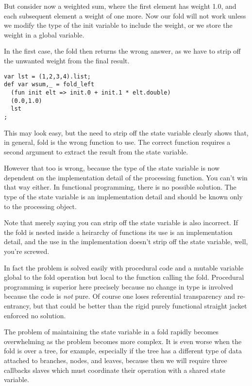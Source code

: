 \documentclass{article}
\begin{document}
But consider now a weighted sum, where the first element
has weight 1.0, and each subsequent element a weight of
one more. Now our fold will not work unless we modify
the type of the init variable to include the weight,
or we store the weight in a global variable.

In the first case, the fold then returns the wrong answer,
as we have to strip off the unwanted weight from the final
result.

\begin{verbatim}
var lst = (1,2,3,4).list;
def var wsum,_ = fold_left 
  (fun init elt => init.0 + init.1 * elt.double)
  (0.0,1.0)
  lst
;
\end{verbatim}

This may look easy, but the need to strip off the state 
variable clearly shows that, in general, fold is the wrong
function to use. The correct function requires a second
argument to extract the result from the state variable.

However that too is wrong, because the type of the state
variable is now dependent on the implementation detail
of the processing function. You can't win that way either.
In functional programming, there is no possible solution.
The type of the state variable is an implementation detail
and should be known only to the processing object.

Note that merely saying you can strip off the state variable
is also incorrect. If the fold is nested inside a heirarchy
of functions its use is an implementation detail, and the 
use in the implementation doesn't strip off the state
variable, well, you're screwed.

In fact the problem is solved easily with procedural
code and a mutable variable global to the fold operation
but local to the function calling the fold. Procedural
programming is superior here precisely because no change
in type is involved because the code is {\em not} pure.
Of course one loses referential transparency and re-entrancy,
but that could be better than the rigid purely functional
straight jacket enforced no solution.

The problem of maintaining the state variable in a fold
rapidly becomes overwhelming as the problem becomes more
complex. It is even worse when the fold is over a tree,
for example, especially if the tree has a different type
of data attached to branches, nodes, and leaves, because
then we will require three callbacks slaves which must
coordinate their operation with a shared state variable.
\end{document}
